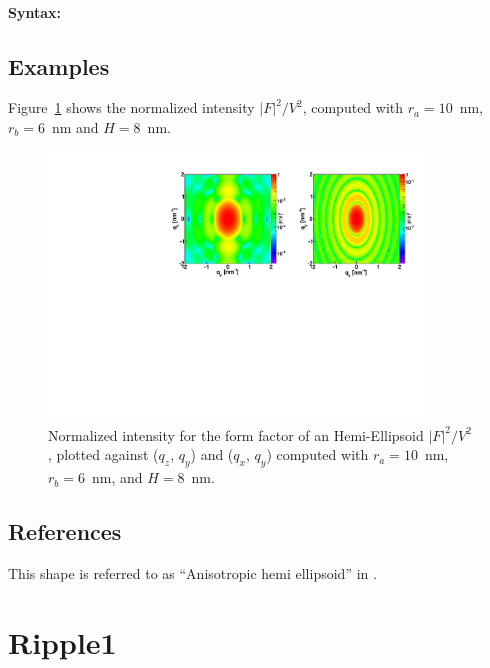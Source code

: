 \paragraph{Syntax:} 

\subsection{Examples}
Figure~\ref{figFFhemiellipsEx} shows the normalized intensity
$|F|^2/V^2$, computed with $r_a=10$~nm, $r_b=6$~nm and $H=8$~nm.

\begin{figure}[h]
\begin{center}
\includegraphics[width=0.9\textwidth]{Figures/figffhemiellips}
\end{center}
\caption{Normalized intensity for the form factor of an Hemi-Ellipsoid
  $|F|^2/V^2$, plotted against ($q_z$, $q_y$) and  ($q_x$, $q_y$)
  computed with $r_a=10$~nm, $r_b=6$~nm, and $H=8$~nm.}
\label{figFFhemiellipsEx}
\end{figure}
\FloatBarrier

\subsection{References}
This shape is referred to as ``Anisotropic hemi ellipsoid'' in  .
\newpage{\cleardoublepage}
\section{Ripple1}   

